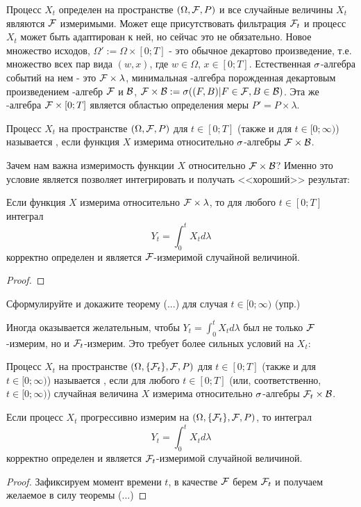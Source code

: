 {Процесс $X_{t}$ определен на пространстве $(\Omega,\mathcal{F},P)$ и все случайные величины $X_{t}$ являются $\mathcal{F}$ измеримыми.  Может еще присутствовать фильтрация $\mathcal{F}_{t}$ и процесс $X_{t}$ может быть адаптирован к ней, но сейчас это не обязательно. Новое множество исходов, $\Omega':=\Omega\times [0;T]$ - это обычное декартово произведение, т.е. множество всех пар вида $(w,x)$, где $w\in\Omega$, $x\in [0;T]$. Естественная $\sigma$-алгебра событий на нем - это $\mathcal{F}\times\lambda$, минимальная \s-алгебра порожденная декартовым произведением \s-алгебр $\mathcal{F}$ и $\mathcal{B}$, $\mathcal{F}\times\mathcal{B}:=\sigma((F,B)|F\in\mathcal{F},B\in\mathcal{B})$. Эта же \s-алгебра $\mathcal{F}\times [0;T]$ является областью определения меры $P'=P\times\lambda$.

\begin{mydef} Процесс $X_{t}$ на пространстве $(\Omega,\mathcal{F},P)$ для $t\in[0;T]$ (также и для $t\in[0;\infty)$) называется , если функция $X$ измерима относительно $\sigma$-алгебры $\mathcal{F}\times \mathcal{B}$.
\end{mydef}

Зачем нам важна измеримость функции $X$ относительно $\mathcal{F}\times\mathcal{B}$? Именно это условие является позволяет интегрировать и получать <<хороший>> результат:

\begin{myth} Если функция $X$ измерима относительно $\mathcal{F}\times\lambda$, то для любого $t\in [0;T]$ интеграл $$Y_{t}=\int_{0}^{t}X_{t}d\lambda$$ корректно определен и является $\mathcal{F}$-измеримой случайной величиной.
\end{myth}
\begin{proof}
\end{proof}

Сформулируйте и докажите теорему (...) для случая $t\in[0;\infty)$ (упр.)

Иногда оказывается желательным, чтобы $Y_{t}=\int_{0}^{t}X_{t}d\lambda$ был не только $\mathcal{F}$-измерим, но и $\mathcal{F}_{t}$-измерим. Это требует более сильных условий на $X_{t}$: 

\begin{mydef} Процесс $X_{t}$ на пространстве $(\Omega,\{\mathcal{F}_{t}\},\mathcal{F},P)$ для $t\in[0;T]$ (также и для $t\in[0;\infty)$) называется , если для любого $t\in[0;T]$ (или, соответственно, $t\in[0;\infty)$) случайная величина $X$ измерима относительно $\sigma$-алгебры $\mathcal{F}_{t}\times \mathcal{B}$.
\end{mydef}
\begin{myth} Если процесс $X_{t}$ прогрессивно измерим на $(\Omega,\{\mathcal{F}_{t}\},\mathcal{F},P)$, то интеграл $$Y_{t}=\int_{0}^{t}X_{t}d\lambda$$ корректно определен и является $\mathcal{F}_{t}$-измеримой случайной величиной.
\end{myth}
\begin{proof} Зафиксируем момент времени $t$, в качестве $\mathcal{F}$ берем $\mathcal{F}_{t}$ и получаем желаемое в силу теоремы (...) 
\end{proof}

}
